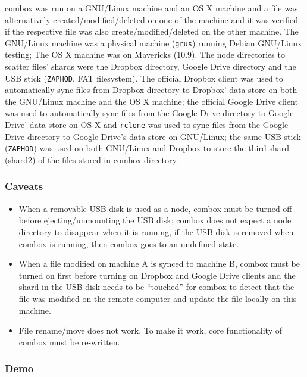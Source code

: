 combox was run on a GNU/Linux machine and an OS X machine and a file
was alternatively created/modified/deleted on one of the machine and
it was verified if the respective file was also
create/modified/deleted on the other machine. The GNU/Linux machine
was a physical machine (\verb+grus+) running Debian GNU/Linux testing;
The OS X machine was on Mavericks (10.9). The node directories to
scatter files' shards were the Dropbox directory, Google Drive
directory and the USB stick (\verb+ZAPHOD+, FAT filesystem). The
official Dropbox client was used to automatically sync files from
Dropbox directory to Dropbox' data store on both the GNU/Linux machine
and the OS X machine; the official Google Drive client was used to
automatically sync files from the Google Drive directory to Google
Drive' data store on OS X and \verb+rclone+\cite{program:rclone} was
used to sync files from the Google Drive directory to Google Drive's
data store on GNU/Linux; the same USB stick (\verb+ZAPHOD+) was used
on both GNU/Linux and Dropbox to store the third shard (shard2) of the
files stored in combox directory.

\subsubsection{Caveats}

\begin{itemize}
\item When a removable USB disk is used as a node, combox must be
  turned off before ejecting/unmounting the USB disk; combox does not
  expect a node directory to disappear when it is running, if the USB
  disk is removed when combox is running, then combox goes to an
  undefined state.

\item When a file modified on machine A is synced to machine B, combox
  must be turned on first before turning on Dropbox and Google Drive
  clients and the shard in the USB disk needs to be ``touched'' for
  combox to detect that the file was modified on the remote computer
  and update the file locally on this machine.

\item File rename/move does not work. To make it work, core
  functionality of combox must be re-written.
\end{itemize}

\subsubsection{Demo}

